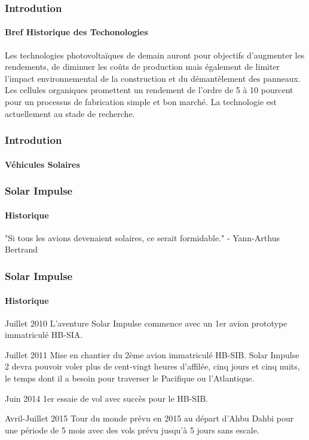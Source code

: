 \documentclass{beamer}
\begin{document}
\begin{frame}
\frametitle{Introdution}
\framesubtitle{Bref Historique des Techonologies}
Les technologies photovoltaïques de demain auront pour objectifs d’augmenter les rendements, de diminuer les coûts de production mais également de limiter l’impact environnemental de la construction et du démantèlement des panneaux. Les cellules organiques promettent un rendement de l’ordre de 5 à 10 pourcent  pour un processus de fabrication simple et bon marché. La technologie est actuellement au stade de recherche.

\end{frame}

\begin{frame}
\frametitle{Introdution}
\framesubtitle{Véhicules Solaires}

\end{frame}


\begin{frame}
\frametitle{Solar Impulse}
\framesubtitle{Historique}
"Si tous les avions devenaient solaires, ce serait formidable." - Yann-Arthus Bertrand

\begin{figure}
\end{figure}

\end{frame}



\begin{frame}
\frametitle{Solar Impulse}
\framesubtitle{Historique}
\begin{block}{Juillet 2010}
L’aventure Solar Impulse commence avec un 1er avion prototype immatriculé HB-SIA. 
\end{block}

\begin{block}{Juillet 2011}
Mise en chantier du 2ème avion immatriculé HB-SIB. Solar Impulse 2 devra pouvoir voler plus de cent-vingt heures d'affilée, cinq jours et cinq nuits, le temps dont il a besoin pour traverser le Pacifique ou l'Atlantique.
\end{block}

\begin{block}{Juin 2014}
1er essaie de vol avec succès pour le HB-SIB.
\end{block}


\begin{block}{Avril-Juillet 2015}
Tour du monde prévu en 2015 au départ d’Ahbu Dahbi pour une période de 5 mois avec des vols prévu jusqu’à 5 jours sans escale. 
\end{block}

\end{frame}
\end{document}
